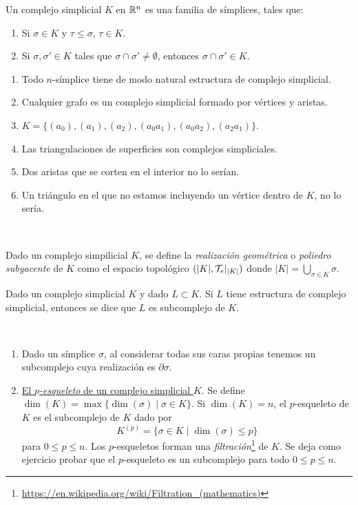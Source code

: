 \documentclass[HS.tex]{subfiles}
\begin{document}
\begin{defi}
Un complejo simplicial $K$ en $\mathbb{R}^n$ es una familia de símplices, tales que:
\begin{enumerate}
\item Si $\sigma\in K$ y $\tau\leq\sigma$, $\tau\in K$.
\item Si $\sigma,\sigma'\in K$ tales que $\sigma\cap\sigma'\neq\emptyset$, entonces $\sigma\cap\sigma'\in K$.
\end{enumerate}
\end{defi}

\begin{ej}
\begin{enumerate}
\item Todo $n$-símplice tiene de modo natural estructura de complejo simplicial.
\item Cualquier grafo es un complejo simplicial formado por vértices y aristas.
\item $K=\{(a_0),(a_1),(a_2),(a_0a_1),(a_0a_2),(a_2a_1)\}$.
\item Las triangulaciones de superficies son complejos simpliciales. 
\item Dos aristas que se corten en el interior no lo serían.
\item Un triángulo en el que no estamos incluyendo un vértice dentro de $K$, no lo sería.
\end{enumerate}
\end{ej}\

\begin{defi}
Dado un complejo simpilicial $K$, se define la \emph{realización geométrica} o \emph{poliedro subyacente} de $K$ como el espacio topológico $(|K|,\mathcal{T}_e|_{|K|})$ donde $|K|=\underset{\sigma\in K}{\bigcup}\sigma$.
\end{defi}

\begin{defi}
Dado un complejo simplicial $K$ y dado $L\subset K$. Si $L$ tiene estructura de complejo simplicial, entonces se dice que $L$ es subcomplejo de $K$.
\end{defi}
\begin{ej}\
\begin{enumerate}
\item Dado un símplice $\sigma$, al considerar todas sus caras propias tenemos un subcomplejo cuya realización es $\partial\sigma$.
\item \underline{El \emph{$p$-esqueleto} de un complejo simplicial $K$}. Se define $\dim(K)=\max\{\dim(\sigma)\mid\sigma\in K\}$. Si $\dim(K)=n$, el $p$-esqueleto de $K$ es el subcomplejo de $K$ dado por
$$K^{(p)}=\{\sigma\in K\mid \dim(\sigma)\leq p\}$$
para $0\leq p\leq n$. Los $p$-esqueletos forman una \emph{filtración}\footnote{\url{https://en.wikipedia.org/wiki/Filtration_(mathematics)}} de $K$. Se deja como ejercicio probar que el $p$-esqueleto es un subcomplejo para todo $0\leq p\leq n$.
\end{enumerate}
\end{ej}
\end{document}
